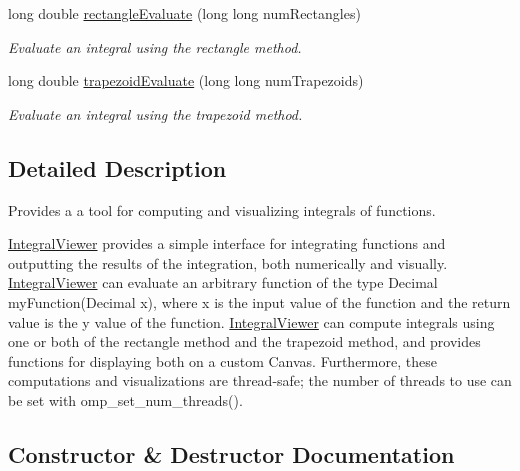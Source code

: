 \begin{DoxyCompactItemize}
long double \hyperlink{class_integral_viewer_adbc445570ed3ba2d6bf18404b972a633}{rectangle\+Evaluate} (long long num\+Rectangles)
\begin{DoxyCompactList}\small\item\em Evaluate an integral using the rectangle method. \end{DoxyCompactList}\item 
long double \hyperlink{class_integral_viewer_a1a8731392ee77f0d97a02414ac4e38c7}{trapezoid\+Evaluate} (long long num\+Trapezoids)
\begin{DoxyCompactList}\small\item\em Evaluate an integral using the trapezoid method. \end{DoxyCompactList}\end{DoxyCompactItemize}


\subsection{Detailed Description}
Provides a a tool for computing and visualizing integrals of functions. 

\hyperlink{class_integral_viewer}{Integral\+Viewer} provides a simple interface for integrating functions and outputting the results of the integration, both numerically and visually. \hyperlink{class_integral_viewer}{Integral\+Viewer} can evaluate an arbitrary function of the type {\ttfamily Decimal my\+Function(\+Decimal x)}, where x is the input value of the function and the return value is the y value of the function. \hyperlink{class_integral_viewer}{Integral\+Viewer} can compute integrals using one or both of the rectangle method and the trapezoid method, and provides functions for displaying both on a custom Canvas. Furthermore, these computations and visualizations are thread-\/safe; the number of threads to use can be set with {\ttfamily omp\+\_\+set\+\_\+num\+\_\+threads()}. 

\subsection{Constructor \& Destructor Documentation}
\hypertarget{class_integral_viewer_adecb5be9f7e9a78ed92012d03fda60a4}{}
